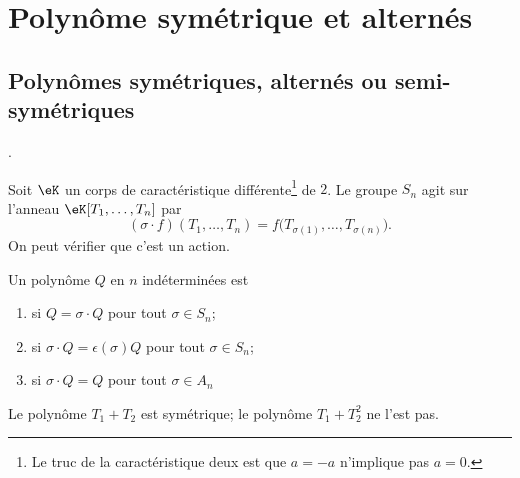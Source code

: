 \section{Polynôme symétrique et alternés}

\subsection{Polynômes symétriques, alternés ou semi-symétriques}
\cite{fJhCTE}.

Soit \( \eK\) un corps de caractéristique différente\footnote{Le truc de la caractéristique deux est que \( a=-a\) n'implique pas \( a=0\).} de \(2\). Le groupe \( S_n\) agit sur l'anneau \( \eK[T_1,\ldots, T_n]\) par
\begin{equation}
    (\sigma\cdot f)(T_1,\ldots, T_n)=f\big( T_{\sigma(1)},\ldots, T_{\sigma(n)} \big).
\end{equation}
On peut vérifier que c'est un action.

\begin{definition}
    Un polynôme \( Q\) en \( n\) indéterminées est 
    \begin{enumerate}
        \item
             si \( Q=\sigma\cdot Q\) pour tout \( \sigma\in S_n\);
        \item
             si \( \sigma\cdot Q=\epsilon(\sigma)Q\) pour tout \( \sigma\in S_n\);
        \item
             si \( \sigma\cdot Q=Q\) pour tout \( \sigma\in A_n\)
    \end{enumerate}
\end{definition}
Le polynôme \( T_1+T_2\) est symétrique; le polynôme \( T_1+T_2^2\) ne l'est pas. 

